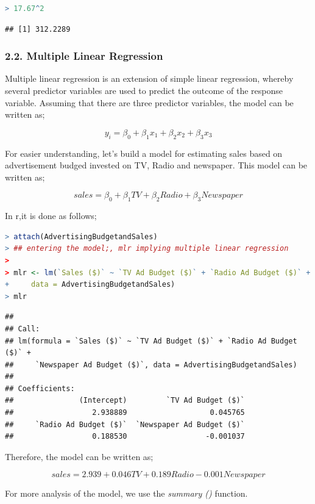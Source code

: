 \documentclass[
]{article}
\begin{document}
\begin{lstlisting}[language=R]
> 17.67^2
\end{lstlisting}

\begin{lstlisting}
## [1] 312.2289
\end{lstlisting}

\hypertarget{multiple-linear-regression}{%
\subsubsection{2.2. Multiple Linear
Regression}\label{multiple-linear-regression}}

Multiple linear regression is an extension of simple linear regression,
whereby several predictor variables are used to predict the outcome of
the response variable. Assuming that there are three predictor
variables, the model can be written as;

\[y_i=\beta_0+\beta_1x_1+\beta_2x_2+\beta_3x_3\]

For easier understanding, let's build a model for estimating sales based
on advertisement budged invested on TV, Radio and newspaper. This model
can be written as;

\[sales=\beta_0 +\beta_1TV+\beta_2Radio+\beta_3Newspaper\]

In r,it is done as follows;

\begin{lstlisting}[language=R]
> attach(AdvertisingBudgetandSales)
> ## entering the model;, mlr implying multiple linear regression
> 
> mlr <- lm(`Sales ($)` ~ `TV Ad Budget ($)` + `Radio Ad Budget ($)` + `Newspaper Ad Budget ($)`,
+     data = AdvertisingBudgetandSales)
> mlr
\end{lstlisting}

\begin{lstlisting}
## 
## Call:
## lm(formula = `Sales ($)` ~ `TV Ad Budget ($)` + `Radio Ad Budget ($)` + 
##     `Newspaper Ad Budget ($)`, data = AdvertisingBudgetandSales)
## 
## Coefficients:
##               (Intercept)         `TV Ad Budget ($)`  
##                  2.938889                   0.045765  
##     `Radio Ad Budget ($)`  `Newspaper Ad Budget ($)`  
##                  0.188530                  -0.001037
\end{lstlisting}

Therefore, the model can be written as;

\[sales=2.939+0.046TV+0.189Radio-0.001Newspaper\]

For more analysis of the model, we use the \emph{summary ()} function.
\end{document}
